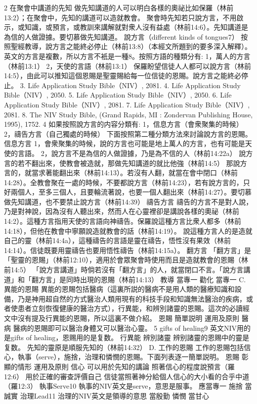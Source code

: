 2 在聚會中講道的先知 做先知講道的人可以明白各樣的奧祕比如保羅（林前13:2）；在聚會中，先知的講道可以造就教會。
聚會時先知若只說方言，不用啟示，或知識，或預言，或教訓來講解就對衆人沒有益處（林前14:6）。先知講道是為信的人做證據。要切慕做先知講道。
說方言（different kinds of tongues7） 按照聖經教導，說方言之能終必停止（林前13:8）（本經文所題到的要多深入解釋）。英文的方言是複數，所以方言不衹是一種8。按照方語的種類分有: 1，萬人的方言（林前13:1） 2，天使的言語（林前13:1） 保羅盼望信徒人人都可以說方言（林前14:5），由此可以推知這個恩賜是聖靈賜給每一位信徒的恩賜。說方言之能終必停止。
3. Life Application Study Bible（NIV）, 2081.
4. Life Application Study Bible（NIV）, 2050.
5. Life Application Study Bible（NIV）, 2050.
6. Life Application Study Bible（NIV）, 2081.
7. Life Application Study Bible（NIV）, 2081.
8. The NIV Study Bible, (Grand Rapids, MI : Zondervan Publishing House, 1995), 1752.
4
如果按照說方言的内容分類有:
1，信息方言（會衆聚集的時候）
2，禱告方言（自己獨處的時候）
下面按照第二種分類方法來討論說方言的恩賜。
信息方言
1，會衆聚集的時候，說的方言也可能是地上萬人的方言，也有可能是天使的言語。 2，說方言不是為信的人做證據，乃是為不信的人（林前14:22a）
說方言的若不翻出來，使教會被造就，那做先知講道的就比他強（林前14:5） 那說方言的，就當求著能翻出來（林前14:13）。若沒有人翻，就當在會中閉口（林前14:28）。全教會聚在一處的時候，不要都說方言（林前14:23），若有說方言的，只好兩個人，至多三個人，且要輪流著說，也要一個人翻出來（林前14:27）。要切慕做先知講道，也不要禁止說方言（林前14:39）
禱告方言 禱告的方言不是對人說，乃是對神說，因為沒有人聽出來，然而人在心靈裡卻是講說各樣的奧祕（林前14:2）。這種方言指用天使的言語向神禱告。保羅說這種方言比衆人都多（林前14:18），但他在教會中寧願說造就教會的話（林前14:19）。 說這種方言人的是造就自己的靈（林前14:4a），這種禱告的言語是靈在禱告，悟性沒有果效（林前14:14）。信徒既要用靈禱告也要用悟性禱告（林前14:15a）。
翻方言 「翻方言」是「聖靈的恩賜」（林前12:10），適用於會眾聚會時使用而且是造就教會的恩賜（林前14:5）
「說方言講道」時倘若沒有「翻方言」的人，就當閉口不言。「說方言講道」和「翻方言」是同時出現的恩賜（林前14:13）
教導
當專一
勸化
當專一
C. 異能的恩賜
異能的恩賜包括醫病（這裏所説的醫病不是用人類的醫療知識和設備，乃是神用超自然的方式醫治人類用現有的科技手段和知識無法醫治的疾病，或者使患者立刻恢復健康的醫治方式），行異能，和辨別諸靈的恩賜。這次的必讀經文中沒有提及行異能的恩賜，所以這裏不做介紹。
恩賜
簡單説明
運用及原則
醫病
醫病的恩賜即可以醫治身體又可以醫治心靈。
5
gifts of healing9
英文NIV用的是gifts of healing，恩赐用的是复数。
行異能
辨別諸靈
辨别諸靈的恩赐中的靈是复数。
先知的靈原是順服先知的（林前14:32）
D. 工作的恩賜
工作的恩賜包括信心，執事（serve），施捨，治理和憐憫的恩賜。下面列表逐一簡單説明。
恩賜
彰顯的情形
運用及原則
信心 可以用於先知的講論 照著信心的程度說預言（羅12:6） 用於正確的審查評價自己 信徒當照著神分給個人信心的大小看的合乎中道（羅12:3）
執事Serve10
執事的NIV英文是serve，意思是服事。 應當專一
施捨
當誠實
治理Lead11
治理的NIV英文是領導的意思 當殷勤
憐憫
當甘心

